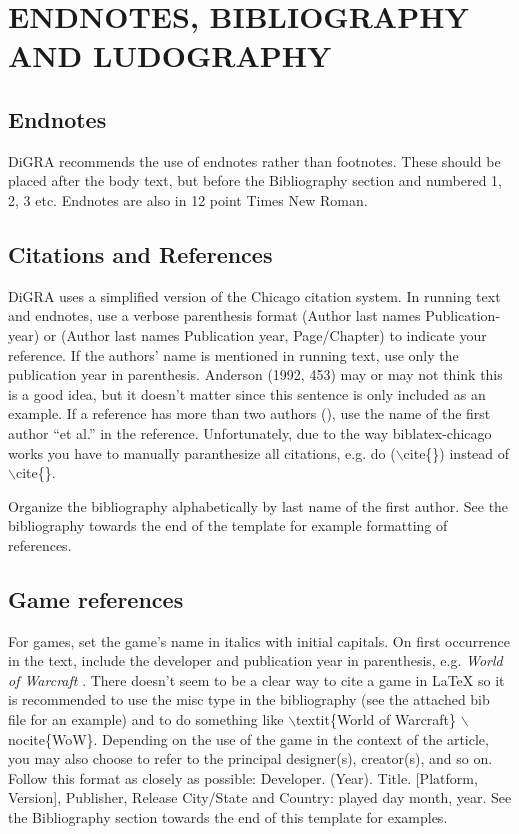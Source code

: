 \documentclass[11pt]{article}
\begin{document}
\section*{ENDNOTES, BIBLIOGRAPHY AND LUDOGRAPHY}
\subsection*{Endnotes}
DiGRA recommends the use of endnotes rather than footnotes. These should be placed
after the body text, but before the Bibliography section and numbered 1, 2, 3 etc.
Endnotes are also in 12 point Times New Roman.

\subsection*{Citations and References}
DiGRA uses a simplified version of the Chicago citation system. In running text and
endnotes, use a verbose parenthesis format (Author last names Publication-year) or
(Author last names Publication year, Page/Chapter) to indicate your reference. If the
authors’ name is mentioned in running text, use only the publication year in parenthesis.
 Anderson (1992, 453) \nocite{ethics} may or may not think this is a good idea, but it doesn’t matter since
this sentence is only included as an example. If a reference has more than two authors
(\cite{schwartz.1995}), use the name of the first author “et al.” in the reference. Unfortunately, due to the way biblatex-chicago works you have to manually paranthesize all citations, e.g. do ($\backslash$cite\{\}) instead of $\backslash$cite\{\}. \nocite{*}

Organize the bibliography alphabetically by last name of the first author. See the
bibliography towards the end of the template for example formatting of references.
\subsection*{Game references}
For games, set the game’s name in italics with initial capitals. On first occurrence in the
text, include the developer and publication year in parenthesis, e.g. \textit{World of Warcraft}
\nocite{WoW}. There doesn't seem to be a clear way to cite a game in LaTeX so it is recommended to use the misc type in the bibliography (see the attached bib file for an example) and to do something like $\backslash$textit\{World of Warcraft\} $\backslash$nocite\{WoW\}.  Depending on the use of the game in the context of the article, you may
also choose to refer to the principal designer(s), creator(s), and so on. Follow this format
as closely as possible:
Developer. (Year). Title. [Platform, Version], Publisher, Release City/State and Country:
played day month, year.
See the Bibliography section towards the end of this template for examples.
\end{document}
